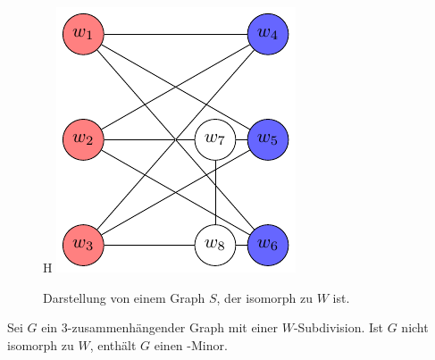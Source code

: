 \begin{figure}{H}
  \centering
  \includegraphics[keepaspectratio]{bilder/W2.pdf}
  \caption{Darstellung von einem Graph $S$, der isomorph zu $W$ ist.}
  \label{fig:W2}
\end{figure}
\begin{lemma}\label{eq:Lemma36}
  Sei $G$ ein $3$-zusammenhängender Graph mit einer $W$-Subdivision.
  Ist $G$ nicht isomorph zu $W$, enthält $G$ einen \kf-Minor.
\end{lemma}
